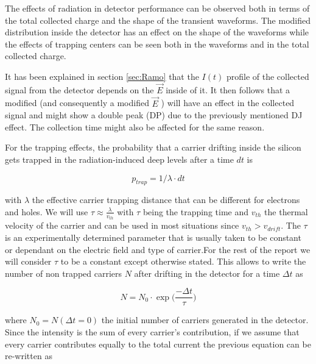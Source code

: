
The effects of radiation in detector performance can be observed both in terms of the total collected charge and the shape of the transient waveforms. The modified \neff distribution inside the detector has an effect on the shape of the waveforms while the effects of trapping centers can be seen both in the waveforms and in the total collected charge.

It has been explained in section \ref{sec:Ramo} that the  $ I (t) $ profile of the collected signal from the detector depends on the $\overrightarrow E $ inside of it. It then follows that a modified \neff  (and consequently a modified  $\overrightarrow E$ ) will have an effect in the collected signal and might show a double peak (DP) due to the previously mentioned DJ effect. The collection time might also be affected for the same reason.

For the trapping effects, the probability that a carrier drifting inside the silicon gets trapped in the radiation-induced deep levels after a time $dt$ is

\[p_{trap} = 1/\lambda \cdot dt\] %

with $\lambda$ the effective carrier trapping distance that can be different for electrons and holes. We will use $\tau \approx \frac{\lambda}{v_{th}}$ with $\tau$ being the trapping time and $v_{th}$ the thermal velocity of the carrier and can be used in most situations\cite{Kramberger} since $v_{th} > v_{drift}$. The $\tau$ is an experimentally determined parameter that is usually taken to be constant or dependant on the electric field and type of carrier.For the rest of the report we will consider $\tau$ to be a constant except otherwise stated. This allows to write the number of non trapped carriers $N$ after drifting in the detector for a time $\Delta t$ as

\[N = N_0 \cdot \exp{\big(\frac{-\Delta t}{\tau}} \big)\]

where $N_0 = N(\Delta t = 0)$ the initial number of carriers generated in the detector. Since the intensity is the sum of every carrier's contribution, if we assume that every carrier contributes equally to the total current the previous equation can be re-written as

